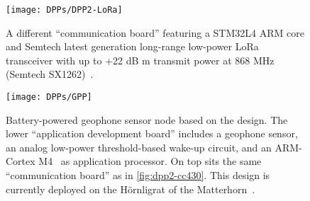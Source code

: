 \begin{subappendices}
\begin{figure}
	\centering
	\texttt{[image: DPPs/DPP2-LoRa]}
	\caption{A different \DPPtwo ``communication board'' featuring a STM32L4 ARM core and Semtech latest generation long-range low-power LoRa transceiver with up to +22 dB m transmit power at 868 MHz (Semtech SX1262)~\cite{semtechSX1262}.}
	\label{fig:dpp2-lora}
\end{figure}

\begin{figure}
	\centering
	\texttt{[image: DPPs/GPP]}
	\caption{Battery-powered geophone sensor node based on the \DPPtwo design.
	The lower ``application development board'' includes a geophone sensor, an analog low-power threshold-based wake-up circuit, and an ARM-Cortex M4~\cite{armCortexM4} as application processor.
	On top sits the same ``communication board'' as in \cref{fig:dpp2-cc430}.
	This design is currently deployed on the Hörnligrat of the Matterhorn~\cite{meyer2019IPSN}.}
	\label{fig:GPP}
\end{figure}

\end{subappendices}
